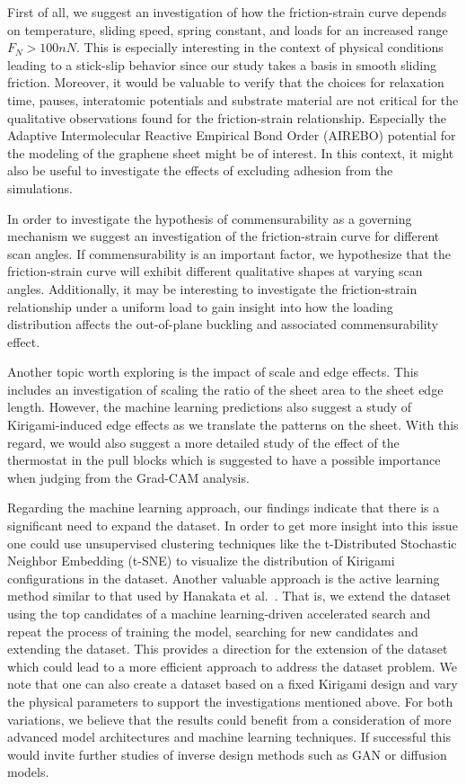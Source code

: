 First of all, we suggest an investigation of how the friction-strain curve
depends on temperature, sliding speed, spring constant, and loads for an
increased range $F_N > 100 nN$. This is especially interesting in the context of
physical conditions leading to a stick-slip behavior since our study takes a
basis in smooth sliding friction. Moreover, it would be valuable to verify that
the choices for relaxation time, pauses, interatomic potentials and substrate
material are not critical for the qualitative observations found for the
friction-strain relationship. Especially the Adaptive Intermolecular Reactive
Empirical Bond Order (AIREBO) potential for the modeling of the graphene sheet
might be of interest. In this context, it might also be useful to investigate
the effects of excluding adhesion from the simulations. 

In order to investigate the hypothesis of commensurability as a governing
mechanism we suggest an investigation of the friction-strain curve for different
scan angles. If commensurability is an important factor, we hypothesize that the friction-strain curve will exhibit different qualitative shapes at varying scan
angles. Additionally, it may be interesting to investigate the friction-strain
relationship under a uniform load to gain insight into how the loading
distribution affects the out-of-plane buckling and associated commensurability
effect.

Another topic worth exploring is the impact of scale and edge effects. This includes an investigation of scaling the ratio of the sheet area to the sheet edge length. However, the machine learning predictions also suggest a study of Kirigami-induced edge effects as we translate the patterns on the sheet. With this regard, we would also suggest a more detailed study of the effect of the thermostat in the pull blocks which is suggested to have a possible importance when judging from the Grad-CAM analysis. 

Regarding the machine learning approach, our findings indicate that there is a
significant need to expand the dataset. In order to get more insight into this
issue one could use unsupervised clustering techniques like the t-Distributed
Stochastic Neighbor Embedding (t-SNE) to visualize the distribution of Kirigami
configurations in the dataset. Another valuable approach is the active learning
method similar to that used by Hanakata et al.~\cite{PhysRevLett.121.255304}.
That is, we extend the dataset using the top candidates of a machine
learning-driven accelerated search and repeat the process of training the model,
searching for new candidates and extending the dataset. This provides a
direction for the extension of the dataset which could lead to a more efficient
approach to address the dataset problem. We note that one can also create a dataset based on a fixed Kirigami design and vary the physical parameters to support the investigations mentioned above. For both variations, we believe that the results could benefit from a consideration of more advanced model architectures and machine learning techniques. If successful this would invite further studies of inverse design methods such as \acrshort{GAN} or diffusion models. 

